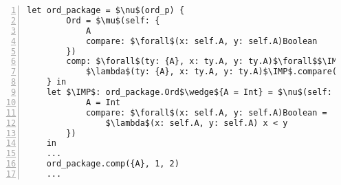 \begin{figure*}[h]
\begin{lstlisting}[mathescape,numbers=left]
    let ord_package = $\nu$(ord_p) {
        Ord = $\mu$(self: {
            A
            compare: $\forall$(x: self.A, y: self.A)Boolean
        })
        comp: $\forall$(ty: {A}, x: ty.A, y: ty.A)$\forall$$\IMP$(ev: ord_p.Ord$\wedge${A})Boolean =
            $\lambda$(ty: {A}, x: ty.A, y: ty.A)$\IMP$.compare(x, y)
    } in
    let $\IMP$: ord_package.Ord$\wedge${A = Int} = $\nu$(self: {
            A = Int
            compare: $\forall$(x: self.A, y: self.A)Boolean =
                $\lambda$(x: self.A, y: self.A) x < y
        })
    in
    ...
    ord_package.comp({A}, 1, 2)
    ...
\end{lstlisting}
\caption*{\textbf{Example 2.} The type class pattern in DIF}
\end{figure*}
